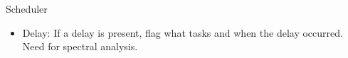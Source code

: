 \begin{frame}{Scheduler}
    \begin{itemize}
        \item Delay: If a delay is present, flag what tasks and when the delay occurred. Need for spectral analysis.
    \end{itemize}
\end{frame}



